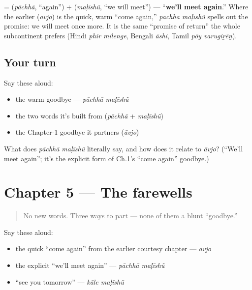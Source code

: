 \begin{cousinweb}
\textbf{ } = \textbf{} (\emph{pāchhā}, \textquotedblleft{}again\textquotedblright{}) + \textbf{} (\emph{maḷīshũ}, \textquotedblleft{}we will meet\textquotedblright{}) — \textquotedblleft{}\textbf{we'll meet again}.\textquotedblright{} Where the earlier \textbf{} (\emph{āvjo}) is the quick, warm \textquotedblleft{}come again,\textquotedblright{} \emph{pāchhā maḷīshũ} spells out the promise: we will meet once more. It is the same \textquotedblleft{}promise of return\textquotedblright{} the whole subcontinent prefers (Hindi \emph{phir milenge}, Bengali \emph{āshi}, Tamil \emph{pōy varugiṟēṉ}).
\end{cousinweb}

\subsection*{Your turn}
Say these aloud:

\begin{itemize}
\raggedright
  \item the warm goodbye — \emph{pāchhā maḷīshũ}
  \item the two words it's built from (\emph{pāchhā} + \emph{maḷīshũ})
  \item the Chapter-1 goodbye it partners (\emph{āvjo})
\end{itemize}

\begin{tcolorbox}[breakable,colback=teal!4,colframe=teal!35!black,title={Before you move on}]
What does \emph{pāchhā maḷīshũ} literally say, and how does it relate to \emph{āvjo}? (\textquotedblleft{}We'll meet again\textquotedblright{}; it's the explicit form of Ch.1's \textquotedblleft{}come again\textquotedblright{} goodbye.)
\end{tcolorbox}
\section[Practice]{Chapter 5 — The farewells}

\label{lesson:GU-C04-practice}



\begin{quote}
No new words. Three ways to part — none of them a blunt \textquotedblleft{}goodbye.\textquotedblright{}
\end{quote}

\begin{culture}
Say these aloud:

\begin{itemize}
\raggedright
  \item the quick \textquotedblleft{}come again\textquotedblright{} from the earlier courtesy chapter — \emph{āvjo}
  \item the explicit \textquotedblleft{}we'll meet again\textquotedblright{} — \emph{pāchhā maḷīshũ}
  \item \textquotedblleft{}see you tomorrow\textquotedblright{} — \emph{kāle maḷīshũ}
\end{itemize}
\end{culture}

